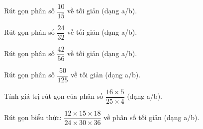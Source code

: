 \begin{ex} %
Rút gọn phân số $\dfrac{10}{15}$ về tối giản (dạng a/b).
\end{ex}

\begin{ex} %
Rút gọn phân số $\dfrac{24}{32}$ về tối giản (dạng a/b).
\end{ex}

\begin{ex} %
Rút gọn phân số $\dfrac{42}{56}$ về tối giản (dạng a/b).
\end{ex}

\begin{ex} %
Rút gọn phân số $\dfrac{50}{125}$ về tối giản (dạng a/b).
\end{ex}

\begin{ex} %
Tính giá trị rút gọn của phân số $\dfrac{16 \times 5}{25 \times 4}$ (dạng a/b).
\end{ex}

\begin{ex} %
Rút gọn biểu thức: $\dfrac{12 \times 15 \times 18}{24 \times 30 \times 36}$ về phân số tối giản (dạng a/b).
\end{ex}
